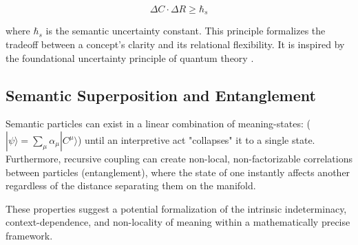 \begin{equation}
\Delta C \cdot \Delta R \geq \hbar_s
\end{equation}

where \(\hbar_s\) is the semantic uncertainty constant. This principle formalizes the tradeoff between a concept's clarity and its relational flexibility. It is inspired by the foundational uncertainty principle of quantum theory \autocite{Heisenberg1927, WheelerZurek1983}.


\subsection{Semantic Superposition and Entanglement}
\label{13.7.2:semantic_superposition_and_entanglement}

Semantic particles can exist in a linear combination of meaning-states: (\(|\psi\rangle = \sum_\mu \alpha_\mu |C^\mu\rangle\)) until an interpretive act "collapses" it to a single state. Furthermore, recursive coupling can create non-local, non-factorizable correlations between particles (entanglement), where the state of one instantly affects another regardless of the distance separating them on the manifold.

These properties suggest a potential formalization of the intrinsic indeterminacy, context-dependence, and non-locality of meaning within a mathematically precise framework. 